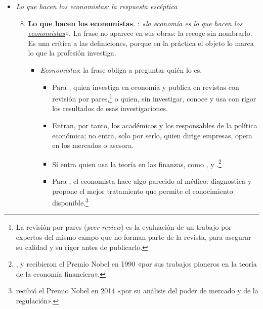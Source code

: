 \documentclass[11pt]{article}
\begin{document}
\begin{itemize}
\begin{enumerate}
\begin{itemize}
    \item \emph{Conscientemente}: donde el derecho o la sociología veían conductas irracionales o determinadas por el entorno,  ve \emph{sujetos activos}, que responden a costes y beneficios, lo que permite predecir el efecto de una política sobre la natalidad o la delincuencia.
    \end{itemize}
  \end{enumerate}
\item \emph{Lo que hacen los economistas: la respuesta escéptica}
  \begin{enumerate}\setcounter{enumi}{7}
  \item \textbf{Lo que hacen los economistas}. : \emph{«la economía es lo que hacen los \uline{economistas}»}. La frase no aparece en sus obras: la recoge \textcite[pág.~1]{Boulding1941Economic} sin nombrarlo\nocite{BackhouseMedema2009Definition}. Es una crítica a las definiciones, porque en la práctica el objeto lo marca lo que la profesión investiga.
    \begin{itemize}
    \item \emph{Economistas}: la frase obliga a preguntar quién lo es.
      \begin{itemize}
      \item Para \textcite{Ferreira2013Pseudociencia}, quien investiga en economía y publica en revistas con revisión por pares,\footnote{La revisión por pares (\emph{peer review}) es la evaluación de un trabajo por expertos del mismo campo que no forman parte de la revista, para asegurar su calidad y su rigor antes de publicarlo.} o quien, sin investigar, conoce y usa con rigor los resultados de esas investigaciones.
      \item Entran, por tanto, los académicos y los responsables de la política económica; no entra, solo por serlo, quien dirige empresas, opera en los mercados o asesora.
      \item Sí entra quien usa la teoría en las finanzas, como ,  y .\footnote{,  y  recibieron el Premio Nobel en 1990 «por sus trabajos pioneros en la teoría de la economía financiera»\nocite{Nobel1990Markowitz}.}
      \item Para \textcite{Tirole2017Bien}, el economista hace algo parecido al médico: diagnostica y propone el mejor tratamiento que permite el conocimiento disponible.\footnote{ recibió el Premio Nobel en 2014 «por su análisis del poder de mercado y de la regulación»\nocite{Nobel2014Tirole}.}
      \end{itemize}
    \end{itemize}
  \end{enumerate}
\end{itemize}
\end{document}

